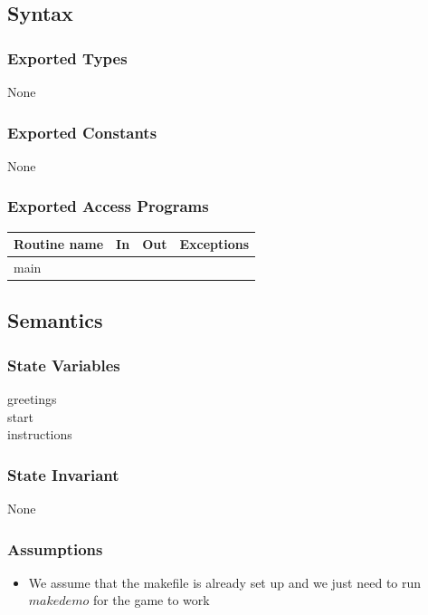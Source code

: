 \documentclass[12pt]{article}
\begin{document}
\subsection* {Syntax}

\subsubsection* {Exported Types}

None

\subsubsection* {Exported Constants}

None

\subsubsection* {Exported Access Programs}

\begin{tabular}{| l | l | l | p{6cm} |}
\hline
\textbf{Routine name} & \textbf{In} & \textbf{Out} & \textbf{Exceptions}\\
\hline
main & ~ & &  \\
\hline
\end{tabular}

\subsection* {Semantics}


\subsubsection* {State Variables}

greetings\\
start\\
instructions\\

\subsubsection* {State Invariant}

None

\subsubsection* {Assumptions}

\begin{itemize}
\item We assume that the makefile is already set up and we just need to run $make demo$ for the game to work
\end{itemize}
\end{document}
